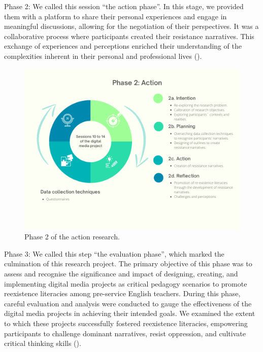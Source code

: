 \documentclass[english]{textolivre}
\begin{document}
Phase 2: We called this session “the action phase”. In this stage, we provided them with a platform to share their personal experiences and engage in meaningful discussions, allowing for the negotiation of their perspectives. It was a collaborative process where participants created their resistance narratives. This exchange of experiences and perceptions enriched their understanding of the complexities inherent in their personal and professional lives ().

\begin{figure}[h!]
    \centering
    \includegraphics[width=0.8\linewidth]{Fig2.png}
    \caption{Phase 2 of the action research.}
    \label{fig2}
\end{figure}

Phase 3: We called this step “the evaluation phase”, which marked the culmination of this research project. The primary objective of this phase was to assess and recognise the significance and impact of designing, creating, and implementing digital media projects as critical pedagogy scenarios to promote reexistence literacies among pre-service English teachers. During this phase, careful evaluation and analysis were conducted to gauge the effectiveness of the digital media projects in achieving their intended goals. We examined the extent to which these projects successfully fostered reexistence literacies, empowering participants to challenge dominant narratives, resist oppression, and cultivate critical thinking skills ().
\end{document}
